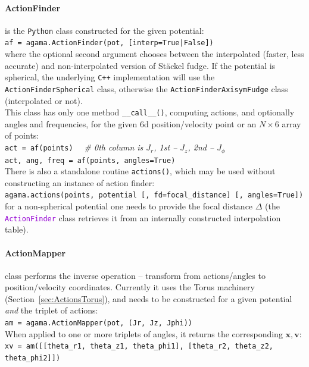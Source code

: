 \documentclass[12pt]{article}
\newcommand{\Cpp}  {\texttt{C++}\xspace}
\newcommand{\Python}{\texttt{Python}\xspace}
\newcommand{\ttt}[1]{\textcolor{darkviolet}{\texttt{#1}}}
\newcommand{\ppp}[1]{\textcolor{darkolive} {\texttt{#1}}}
\newcommand{\bv}{\boldsymbol{v}}
\newcommand{\bx}{\boldsymbol{x}}
\begin{document}
\paragraph{ActionFinder} is the \Python class constructed for the given potential:\\
\texttt{af = agama.ActionFinder(pot, [interp=True|False])}\\
where the optional second argument chooses between the interpolated (faster, less accurate) and non-interpolated version of St\"ackel fudge. If the potential is spherical, the underlying \Cpp implementation will use the \ppp{ActionFinderSpherical} class, otherwise the \ppp{ActionFinderAxisymFudge} class (interpolated or not).\\
This class has only one method \texttt{__call__()}, computing actions, and optionally angles and frequencies, for the given 6d position/velocity point or an $N\times6$ array of points:\\[1mm]
\texttt{act = af(points)}
\textit{\color{Sepia}\ \ \# 0th column is $J_r$, 1st -- $J_z$, 2nd -- $J_\phi$} \\
\texttt{act, ang, freq = af(points, angles=True)}\\[2mm]
There is also a standalone routine \texttt{actions()}, which may be used without constructing an instance of action finder:\\[1mm]
\texttt{agama.actions(points, potential [, fd=focal_distance] [, angles=True])}\\[1mm]
for a non-spherical potential one needs to provide the focal distance $\Delta$ (the \ttt{ActionFinder} class retrieves it from an internally constructed interpolation table).

\paragraph{ActionMapper} class performs the inverse operation -- transform from actions/angles to position/velocity coordinates. Currently it uses the Torus machinery (Section~\ref{sec:ActionsTorus}), and needs to be constructed for a given potential \textit{and} the triplet of actions:\\[1mm]
\texttt{am = agama.ActionMapper(pot, (Jr, Jz, Jphi))}\\[2mm]
When applied to one or more triplets of angles, it returns the corresponding $\bx,\bv$:\\[1mm]
\texttt{xv = am([[theta_r1, theta_z1, theta_phi1], [theta_r2, theta_z2, theta_phi2]])}
\end{document}
